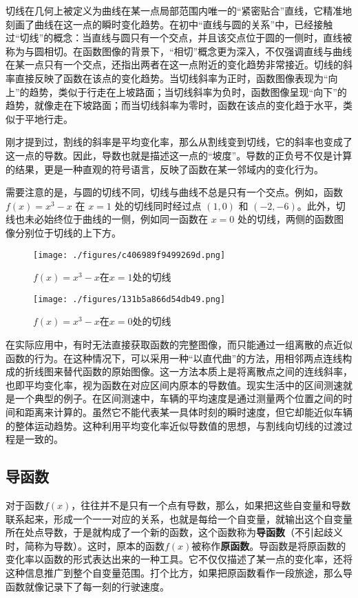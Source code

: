 切线在几何上被定义为曲线在某一点局部范围内唯一的“紧密贴合”直线，它精准地刻画了曲线在这一点的瞬时变化趋势。在初中“直线与圆的关系”中，已经接触过“切线”的概念：当直线与圆只有一个交点，并且该交点位于圆的一侧时，直线被称为与圆相切。在函数图像的背景下，“相切”概念更为深入，不仅强调直线与曲线在某一点只有一个交点，还指出两者在这一点附近的变化趋势非常接近。切线的斜率直接反映了函数在该点的变化趋势。当切线斜率为正时，函数图像表现为“向上”的趋势，类似于行走在上坡路面；当切线斜率为负时，函数图像呈现“向下”的趋势，就像走在下坡路面；而当切线斜率为零时，函数在该点的变化趋于水平，类似于平地行走。

刚才提到过，割线的斜率是平均变化率，那么从割线变到切线，它的斜率也变成了这一点的导数。因此，导数也就是描述这一点的“坡度”。导数的正负号不仅是计算的结果，更是一种直观的符号语言，反映了函数在某一邻域内的变化行为。

需要注意的是，与圆的切线不同，切线与曲线不总是只有一个交点。例如，函数 $f(x) = x^3 - x$ 在 $x = 1$ 处的切线同时经过点 $(1, 0)$ 和 $(-2, -6)$。此外，切线也未必始终位于曲线的一侧，例如同一函数在 $x = 0$ 处的切线，两侧的函数图像分别位于切线的上下方。

\begin{figure}[ht]
\centering
\texttt{[image: ./figures/c406989f9499269d.png]}
\caption{$f(x)=x^3-x$在$x=1$处的切线} \label{fig_HsDerv_1}
\end{figure}

\begin{figure}[ht]
\centering
\texttt{[image: ./figures/131b5a866d54db49.png]}
\caption{$f(x)=x^3-x$在$x=0$处的切线} \label{fig_HsDerv_2}
\end{figure}

在实际应用中，有时无法直接获取函数的完整图像，而只能通过一组离散的点近似函数的行为。在这种情况下，可以采用一种“以直代曲”的方法，用相邻两点连线构成的折线图来替代函数的原始图像。这一方法本质上是将离散点之间的连线斜率，也即平均变化率，视为函数在对应区间内原本的导数值。现实生活中的区间测速就是一个典型的例子。在区间测速中，车辆的平均速度是通过测量两个位置之间的时间和距离来计算的。虽然它不能代表某一具体时刻的瞬时速度，但它却能近似车辆的整体运动趋势。这种利用平均变化率近似导数值的思想，与割线向切线的过渡过程是一致的。

\subsection{导函数}

对于函数$f(x)$，往往并不是只有一个点有导数，那么，如果把这些自变量和导数联系起来，形成一个一一对应的关系，也就是每给一个自变量，就输出这个自变量所在处点导数，于是就构成了一个新的函数，这个函数称为\textbf{导函数}（不引起歧义时，简称为导数）。这时，原本的函数$f(x)$被称作\textbf{原函数}。导函数是将原函数的变化率以函数的形式表达出来的一种工具。它不仅仅描述了某一点的变化率，还将这种信息推广到整个自变量范围。打个比方，如果把原函数看作一段旅途，那么导函数就像记录下了每一刻的行驶速度。

